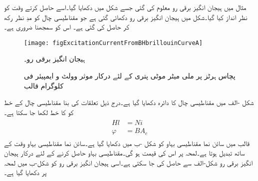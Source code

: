 مثال  میں ہیجان انگیز برقی رو معلوم کی گئی جسے شکل  میں دکھایا گیا۔اسے حاصل کرتے وقت  کو نظر انداز کیا گیا۔شکل  میں ہیجان انگیز برقی رو  دکھائی گئی ہے جو مقناطیسی چال کو مدِ نظر رکھ کر حاصل کی گئی ہے۔ اس کو سمجھنا ضروری ہے۔
\begin{figure}
\centering
\texttt{[image: figExcitationCurrentFromBHbrillouinCurveA]}
\caption{ہیجان انگیز برقی رو۔}
\label{شکل_مقناطیسی_ادوار_ہیجان_رو_بشمول_اثر_چال}
\end{figure}
%
\begin{figure}
%
\caption{پچاس ہرٹز پر  ملی میٹر موٹی پتری کے لئے درکار موثر وولٹ و  ایمپیئر فی کلوگرام قالب}
\label{شکل_مقناطیسی_دور_درکار_ہیجان_وولٹ_ایمپیئر}
\end{figure}

شکل -الف میں  مقناطیسی چال کا دائرہ دکھایا گیا  ہے۔درج ذیل تعلقات کی بنا مقناطیسی چال کے  خط کو  کا خط لکھا جا سکتا ہے۔
\begin{gather}
\begin{aligned}
H l& =N i\\
\varphi&=B A_c
\end{aligned}
\end{gather}
قالب میں سائن نما مقناطیسی بہاو   کو شکل -ب  میں دکھایا گیا ہے۔سائن نما مقناطیسی بہاو وقت کے ساتھ تبدیل ہوتا ہے۔لمحہ  پر اس کی قیمت   ہو گی۔مقناطیسی بہاو  حاصل کرنے کے لئے درکار ہیجان انگیز برقی رو  شکل-الف سے حاصل کی جا سکتی ہے۔اسی  ہیجان انگیز برقی رو کو شکل-ب میں  لمحہ  پر دکھایا گیا ہے۔

